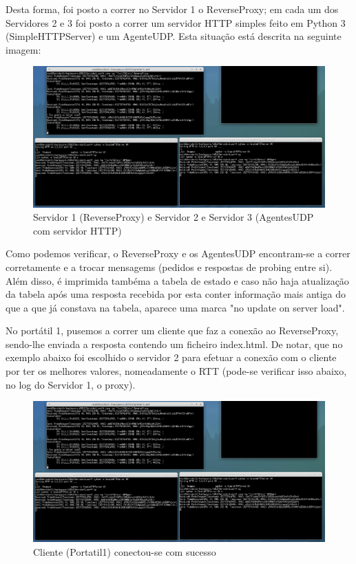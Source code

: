 \documentclass{article}
\begin{document}
Desta forma, foi posto a correr no Servidor 1 o ReverseProxy; em cada um dos Servidores 2 e 3 foi posto a correr um servidor HTTP simples feito em Python 3 (SimpleHTTPServer) e um AgenteUDP. Esta situação está descrita na seguinte imagem:

\begin{figure}[H]
    \centering
    \includegraphics[scale=0.3]{img/semcliente2.png}
    \caption{Servidor 1 (ReverseProxy) e Servidor 2 e Servidor 3 (AgentesUDP com servidor HTTP)}
\end{figure}

Como podemos verificar, o ReverseProxy e os AgentesUDP encontram-se a correr corretamente e a trocar mensagems (pedidos e respostas de probing entre si). Além disso, é imprimida tambéma a tabela de estado e caso não haja atualização da tabela após uma resposta recebida por esta conter informação mais antiga do que a que já constava na tabela, aparece uma marca "no update on server load".

No portátil 1, pusemos a correr um cliente que faz a conexão ao ReverseProxy, sendo-lhe enviada a resposta contendo um ficheiro index.html. De notar, que no exemplo abaixo foi escolhido o servidor 2 para efetuar a conexão com o cliente por ter os melhores valores, nomeadamente o RTT (pode-se verificar isso abaixo, no log do Servidor 1, o proxy).

\begin{figure}[H]
    \centering
    \includegraphics[scale=0.3]{img/semcliente2.png}
    \caption{Cliente (Portatil1) conectou-se com sucesso}
\end{figure}
\end{document}
